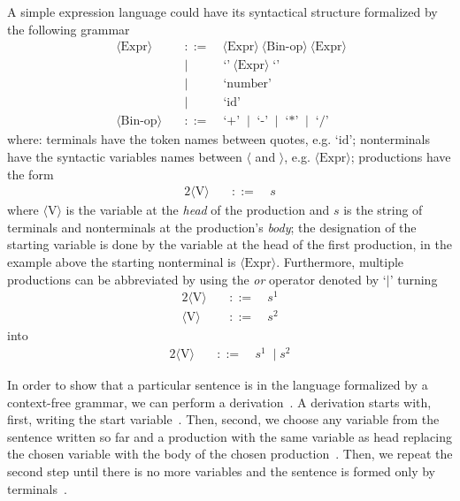 \documentclass[
  oneside,
  english,
  coorientadorbanca,
  embeddedlogo,
  noabntexcite
]{ufsc-thesis-rn46-2019}
\newcommand{\bnfvar}[1]{\ \bnfvars{#1}}
\newcommand{\bnfvars}[1]{\langle\textrm{#1}\rangle}
\newcommand{\bnfter}[1]{\;\bnfters{#1}}
\newcommand{\bnfters}[1]{\textrm{`}\textrm{#1}\textrm{'}}
\newcommand{\bnfor}[1]{\;\mid{} #1}
\newcommand{\bnfprod}[2]{\bnfvars{#1} &\ &::= & #2}
\newcommand{\bnfmore}[1]{ && \mid{} & #1}
\begin{document}
A simple expression language could have its syntactical structure formalized by the following grammar
\begin{equation}~\label{eq:ambiguous_expr_grammar}
  \begin{alignedat}{2}
    \bnfprod{Expr}{\bnfvar{Expr} \bnfvar{Bin-op} \bnfvar{Expr}}  \\
    \bnfmore{\bnfter{}\bnfvar{Expr}\bnfter{}}                    \\
    \bnfmore{\bnfter{number}}                                    \\
    \bnfmore{\bnfter{id}}                                        \\
    \bnfprod{Bin-op}{\bnfter{+} \bnfor{\bnfter{-}} \bnfor{\bnfter{*}} \bnfor{\bnfter{/}}}
  \end{alignedat}
\end{equation}
where: terminals have the token names between quotes, e.g. $\bnfters{id}$;
nonterminals have the syntactic variables names between $\langle$ and $\rangle$, e.g. $\bnfvars{Expr}$;
productions have the form
\begin{alignat}{2}
  \bnfprod{V}{\ s} \nonumber
\end{alignat}
where $\bnfvars{V}$ is the variable at the \textit{head} of the production and $s$ is the string of terminals and nonterminals at the production's \textit{body};
the designation of the starting variable is done by the variable at the head of the first production, in the example above the starting nonterminal is $\bnfvars{Expr}$.
Furthermore, multiple productions can be abbreviated by using the \textit{or} operator denoted by `$\mid$' turning
\begin{alignat}{2}
  \bnfprod{V}{\ s^1} \nonumber \\
  \bnfprod{V}{\ s^2} \nonumber
\end{alignat}
into
\begin{alignat}{2}
  \bnfprod{V}{\ s^1 \bnfor{s^2}} \nonumber
\end{alignat}

In order to show that a particular sentence is in the language formalized by a context-free grammar, we can perform a derivation~\cite{sipser2012introduction}.
A derivation starts with, first, writing the start variable~\cite{sipser2012introduction}.
Then, second, we choose any variable from the sentence written so far and a production with the same variable as head replacing the chosen variable with the body of the chosen production~\cite{sipser2012introduction}.
Then, we repeat the second step until there is no more variables and the sentence is formed only by terminals~\cite{sipser2012introduction}.
\end{document}
